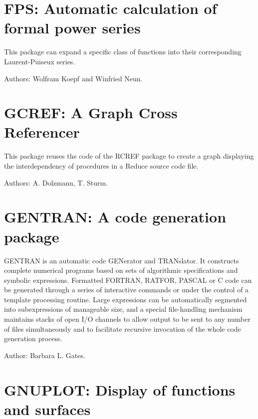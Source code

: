 \newpage

\section{FPS: Automatic calculation of formal power series}

This package can expand a specific class of functions into their
corresponding Laurent-Puiseux series.

Authors: Wolfram Koepf and Winfried Neun.



\newpage


\section{GCREF: A Graph Cross Referencer}
\label{GCREF}

This package reuses the code of the RCREF package to create a graph displaying
the interdependency of procedures in a Reduce source code file. 

Authors: A. Dolzmann, T. Sturm.



\newpage

\section{GENTRAN: A code generation package} 
\label{GENTRAN}

GENTRAN is an automatic code GENerator and TRANslator. It constructs
complete numerical programs based on sets of algorithmic specifications
and symbolic expressions. Formatted FORTRAN, RATFOR, PASCAL or C code can be
generated through a series of interactive commands or under the control of
a template processing routine. Large expressions can be automatically
segmented into subexpressions of manageable size, and a special
file-handling mechanism maintains stacks of open I/O channels to allow
output to be sent to any number of files simultaneously and to facilitate
recursive invocation of the whole code generation process.

Author: Barbara L. Gates.


\newpage

\section{GNUPLOT: Display of functions and surfaces}

